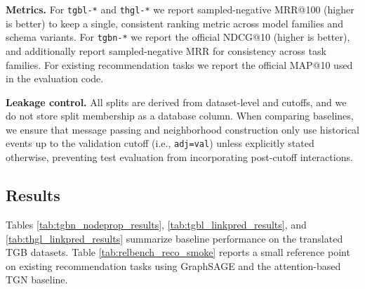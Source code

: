   \textbf{Metrics.}
  For \texttt{tgbl-*} and \texttt{thgl-*} we report sampled-negative MRR@100 (higher is better) to keep a single, consistent ranking metric across model families and schema variants. For \texttt{tgbn-*} we report the official NDCG@10 (higher is better),
  and additionally report sampled-negative MRR for consistency across task families. For existing \relbench recommendation tasks we report the official MAP@10 used in the \relbench evaluation code.

  \textbf{Leakage control.}
  All splits are derived from dataset-level \valtimestamp and \testtimestamp cutoffs, and we do not store split membership as a database column. When comparing baselines, we ensure that message passing and neighborhood construction only use historical
  events up to the validation cutoff (i.e., \texttt{adj=val}) unless explicitly stated otherwise, preventing test evaluation from incorporating post-cutoff interactions.


\subsection{Results} \label{sec:tgb_results}

Tables \ref{tab:tgbn_nodeprop_results}, \ref{tab:tgbl_linkpred_results}, and \ref{tab:thgl_linkpred_results} summarize baseline performance on the translated TGB datasets. Table \ref{tab:relbench_reco_smoke} reports a small reference point on existing \relbench recommendation tasks using GraphSAGE and the attention-based TGN baseline.

